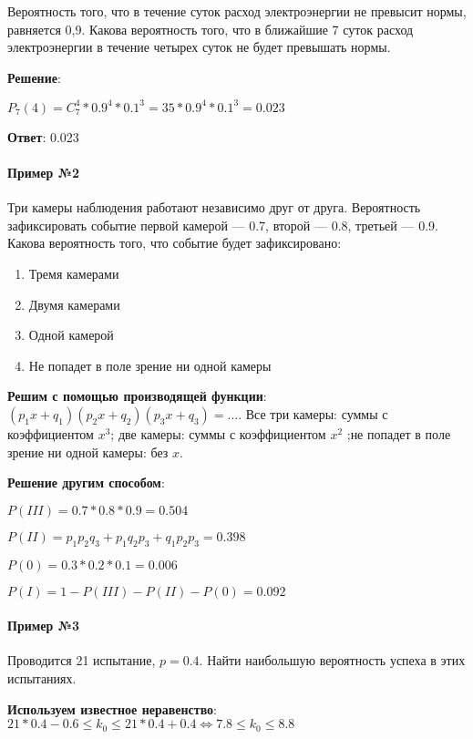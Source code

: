 \documentclass{article}
\begin{document}
Вероятность того, что в течение суток расход электроэнергии не превысит нормы, равняется 0,9. Какова вероятность того, что в ближайшие 7 суток расход электроэнергии в течение четырех суток не будет превышать нормы.

\textbf{Решение}:

$P_{7}(4) = C_{7}^{4} * 0.9^{4} * 0.1^{3} = 35 * 0.9^{4} * 0.1^{3} = 0.023$

\textbf{Ответ}: 0.023

\paragraph{Пример №2}

Три камеры наблюдения работают независимо друг от друга. Вероятность зафиксировать событие первой камерой — 0.7, второй — 0.8, третьей — 0.9. Какова вероятность того, что событие будет зафиксировано:

\begin{enumerate}
    \item Тремя камерами
    \item Двумя камерами
    \item Одной камерой
    \item Не попадет в поле зрение ни одной камеры
\end{enumerate}

\textbf{Решим с помощью производящей функции}: $(p_1x + q_1) (p_2x + q_2)(p_3x + q_3) = \dots$. Все три камеры: суммы с коэффициентом $x^3$; две камеры: суммы с коэффициентом $x^2$ ;не попадет в поле зрение ни одной камеры: без $x$.

\textbf{Решение другим способом}:

$P(III) = 0.7 * 0.8 * 0.9 = 0.504$

$P(II) = p_1 p_2 q_3 + p_1 q_2 p_3 + q_1 p_2 p_3 = 0.398$

$P(0) = 0.3 * 0.2 * 0.1 = 0.006$

$P(I) = 1 - P(III) - P(II) - P(0) = 0.092$

\paragraph{Пример №3}

Проводится 21 испытание, $p = 0.4$. Найти наибольшую вероятность успеха в этих испытаниях.

\textbf{Используем известное неравенство}: $21 * 0.4 - 0.6 \le k_0 \le 21 * 0.4 + 0.4 \Leftrightarrow 7.8 \le k_0 \le 8.8$
\end{document}

